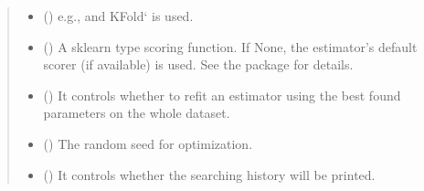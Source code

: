 \documentclass[letterpaper,10pt,english]{sphinxmanual}
\begin{document}
\begin{fulllineitems}
\begin{quote}
\begin{description}
\begin{itemize}
\item {} 
 (\sphinxstyleliteralemphasis{\sphinxupquote{, }}) \textendash{} e.g.,  and KFold{}` is used.

\item {} 
 (\sphinxstyleliteralemphasis{\sphinxupquote{, }}\sphinxstyleliteralemphasis{\sphinxupquote{, }}\sphinxstyleliteralemphasis{\sphinxupquote{, }}\sphinxstyleliteralemphasis{\sphinxupquote{, }}\sphinxstyleliteralemphasis{\sphinxupquote{, }}) \textendash{} A sklearn type scoring function. 
If None, the estimator’s default scorer (if available) is used. See the package  for details.

\item {} 
 (\sphinxstyleliteralemphasis{\sphinxupquote{, }}\sphinxstyleliteralemphasis{\sphinxupquote{, }}) \textendash{} It controls whether to refit an estimator using the best found parameters on the whole dataset.

\item {} 
 (\sphinxstyleliteralemphasis{\sphinxupquote{, }}\sphinxstyleliteralemphasis{\sphinxupquote{, }}) \textendash{} The random seed for optimization.

\item {} 
 (\sphinxstyleliteralemphasis{\sphinxupquote{, }}\sphinxstyleliteralemphasis{\sphinxupquote{, }}) \textendash{} It controls whether the searching history will be printed.


\end{itemize}
\end{description}
\end{quote}
\end{fulllineitems}
\end{document}
